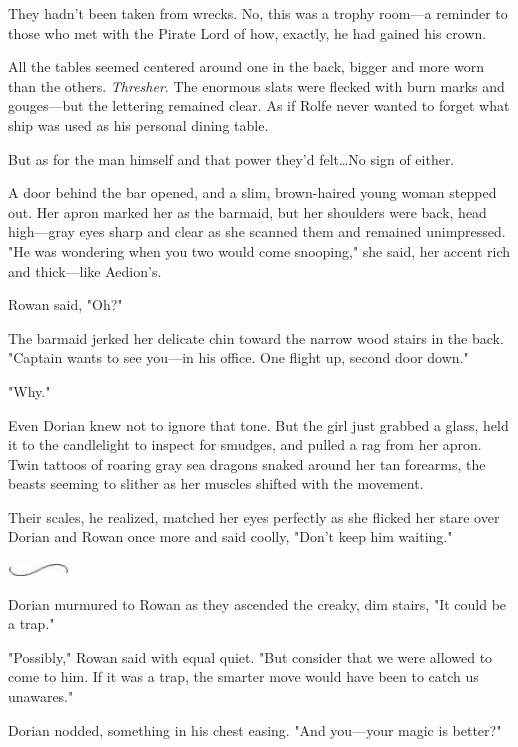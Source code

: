 They hadn't been taken from wrecks.
No, this was a trophy room---a reminder to those who met with the Pirate Lord of how, exactly, he had gained his crown.

All the tables seemed centered around one in the back, bigger and more worn than the others.
\emph{Thresher}.
The enormous slats were flecked with burn marks and gouges---but the lettering remained clear.
As if Rolfe never wanted to forget what ship was used as his personal dining table.

But as for the man himself and that power they'd felt\ldots No sign of either.

A door behind the bar opened, and a slim, brown-haired young woman stepped out.
Her apron marked her as the barmaid, but her shoulders were back, head high---gray eyes sharp and clear as she scanned them and remained unimpressed.
"He was wondering when you two would come snooping," she said, her accent rich and thick---like Aedion's.

Rowan said, "Oh?"

The barmaid jerked her delicate chin toward the narrow wood stairs in the back.
"Captain wants to see you---in his office.
One flight up, second door down."

"Why."

Even Dorian knew not to ignore that tone.
But the girl just grabbed a glass, held it to the candlelight to inspect for smudges, and pulled a rag from her apron.
Twin tattoos of roaring gray sea dragons snaked around her tan forearms, the beasts seeming to slither as her muscles shifted with the movement.

Their scales, he realized, matched her eyes perfectly as she flicked her stare over Dorian and Rowan once more and said coolly, "Don't keep him waiting."

\begin{center}
	\includegraphics[width=0.65in,height=0.13in]{images/seperator}
\end{center}

Dorian murmured to Rowan as they ascended the creaky, dim stairs, "It could be a trap."

"Possibly," Rowan said with equal quiet.
"But consider that we were allowed to come to him.
If it was a trap, the smarter move would have been to catch us unawares."

Dorian nodded, something in his chest easing.
"And you---your magic is  better?"

